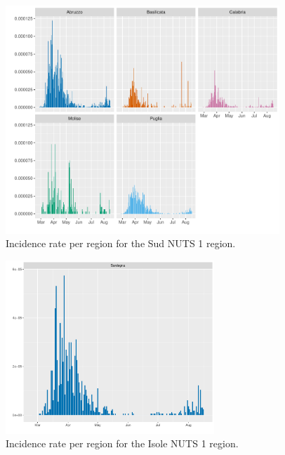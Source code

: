\documentclass[12pt]{article}
\begin{document}
\begin{appendices}
    	\begin{figure}[H]
    	    \centering
    	    \includegraphics[width=0.92\textwidth]{output/infective_rates_Sud.pdf}
    	    \caption{Incidence rate per region for the Sud NUTS 1 region.}
    	    \label{fig:incidence_sud}
    	\end{figure}
    	
    	\begin{figure}[H]
    	    \centering
    	    \includegraphics[width=0.7\textwidth]{output/infective_rates_Isole.pdf}
    	    \caption{Incidence rate per region for the Isole NUTS 1 region.}
    	    \label{fig:incidence_isole}
    	\end{figure}
		
		

\end{appendices}
\end{document}
